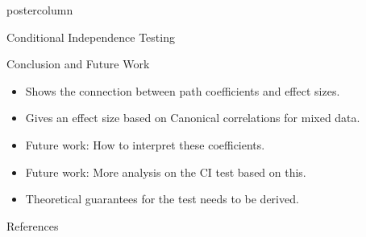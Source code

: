 \documentclass{beamer}
\begin{document}
\begin{frame}
\begin{columns}
\begin{column}{0.33\textwidth}
\begin{beamercolorbox}[center]{postercolumn}
\begin{minipage}{.98\textwidth}
{\begin{myblock}{Conditional Independence Testing}
	\end{myblock}\vfill
	\begin{myblock}{Conclusion and Future Work}
		\begin{itemize}
			\item Shows the connection between path coefficients and effect sizes.
			\item Gives an effect size based on Canonical correlations for mixed data.
			\item Future work: How to interpret these coefficients.
			\item Future work: More analysis on the CI test based on this.
			\item Theoretical guarantees for the test needs to be derived.
		\end{itemize}
	\end{myblock}\vfill
	\begin{myblock}{References}
		\footnotesize
		
	\end{myblock}\vfill
		}\end{minipage}\end{beamercolorbox}
	\end{column}
\end{columns}
\end{frame}
\end{document}
